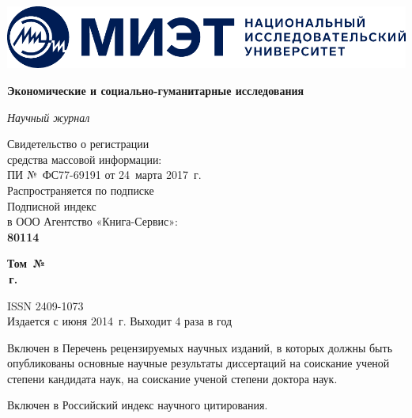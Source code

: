 \pagestyle{empty}
\begin{center}
  \includegraphics[width=\textwidth]{logo}
\vspace*{5mm}
{\fontsize{16pt}{20pt}\selectfont\bfseries Экономические и социально-гуманитарные исследования \par}

{\itshape Научный журнал}
\end{center}

\noindent
\begin{minipage}{.5\textwidth}
  \small
Свидетельство о регистрации\\
средства массовой информации:\\
ПИ № ФС77-69191 от 24 марта 2017 г.\\
Распространяется по подписке\\
Подписной индекс\\
в ООО Агентство «Книга-Сервис»:\\
\textbf{80114}
\end{minipage}%
\begin{minipage}{.5\textwidth}
\begin{flushright}
  {\fontsize{16pt}{20pt}\selectfont\bfseries Том\, \esgiVol{} №\, \esgiNum{}\\
  \esgiYear\,г.\par}

  \vspace{5mm}
  \small
  ISSN 2409-1073\\
  Издается с июня 2014 г. Выходит 4 раза в год
\end{flushright}
\end{minipage}

\begin{flushleft}
  \small
  Включен в Перечень рецензируемых научных изданий, в которых должны быть опубликованы
основные научные результаты диссертаций на соискание ученой степени кандидата наук,
на соискание ученой степени доктора наук.

\vspace{5mm}
Включен в Российский индекс научного цитирования.
\end{flushleft}

\vspace{2cm}

